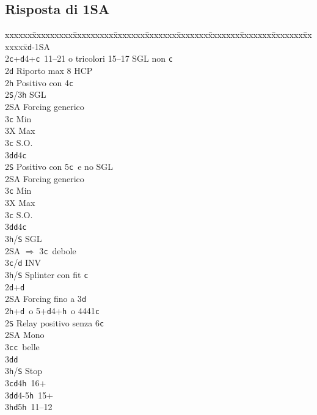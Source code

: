 \documentclass[a4paper,italian]{article}
\newcommand{\BS}{\small{\texttt{S}}}
\newcommand{\BC}{\small{\texttt{c}}}
\newcommand{\BD}{\small{\texttt{d}}}
\newcommand{\BH}{\small{\texttt{h}}}
\newenvironment{bidtable}
{\begin{tabbing}

    xxxxxx\=xxxxxxxxx\=xxxxxxxxx\=xxxxxxx\=xxxxxxx\=xxxxxxx\=xxxxxxx\=xxxxxxx\=xxxxxxx\=xxxxxxx\=\kill}
{\end{tabbing} }%
\begin{document}
\begin{multicols}{2}
    \subsection{Risposta di 1SA}

    \begin{bidtable}
        1\BD-1\small{SA}\+\\
        2\BC {}+\BD 4+\BC\ 11--21 o tricolori 15--17 SGL non \BC \+\\
        2\BD \> Riporto max 8 HCP\\
        2\BH \> Positivo con 4\BC \+\\
        2\BS/3\BH \> SGL\\
        2\small{SA} \> Forcing generico\+\\
        3\BC \> Min\\
        3X \> Max\-\\
        3\BC \> S.O.\\
        3\BD {}\BD 4\BC \-\\
        2\BS \> Positivo con 5\BC\ e no SGL\+\\
        2\small{SA} \> Forcing generico\+\\
        3\BC \> Min\\
        3X \> Max\-\\
        3\BC \> S.O.\\
        3\BD {}\BD 4\BC \\
        3\BH/\BS \> SGL\-\\
        2\small{SA} \> $\Rightarrow$ 3\BC\ debole\\
        3\BC/\BD \> INV\\
        3\BH/\BS \> Splinter con fit \BC \-\\
        2\BD {}+\BD \+\\
        2\small{SA} \> Forcing fino a 3\BD \-\\
        2\BH {}+\BD\ o 5+\BD 4+\BH\ o 4441\BC \+\\
        2\BS \> Relay positivo senza 6\BC \+\\
        2\small{SA} \> Mono\+\\
        3\BC {}\BC\ belle\\
        3\BD {}\BD \\
        3\BH/\BS \> Stop\-\\
        3\BC {}\BD 4\BH\ 16+\\
        3\BD {}\BD 4-5\BH\ 15+\\
        3\BH {}\BD 5\BH\ 11--12\\

\end{bidtable}
\end{multicols}
\end{document}
